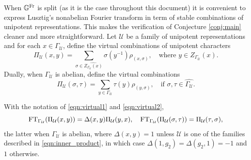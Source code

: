 \newpage

When $\mathbb{G}^{\mathrm{Fr}}$ is split (as it is the case throughout this document) it is convenient to express Lusztig's nonabelian Fourier transform in term of stable combinations of unipotent representations. This makes the verification of Conjecture \ref{conj:main} cleaner and more straightforward. Let $\mathcal{U}$ be a family of unipotent representations and for each $x\in\Gamma_\mathcal{U}$, define the virtual combinations of unipotent characters
\begin{equation}\label{eqn:virtual1}
    \Pi_\mathcal{U}(x,y)=\sum_{\sigma\in\widehat{Z_{\Gamma_\mathcal{U}}(x)}}\sigma(y^{-1})\rho_{(x,\sigma)},\quad\text{where } y\in Z_{\Gamma_\mathcal{U}}(x).
\end{equation}
Dually, when $\Gamma_\mathcal{U}$ is abelian, define the virtual combinations
\begin{equation}\label{eqn:virtual2}
    \Pi_\mathcal{U}(\sigma,\tau)=\sum_{y\in\Gamma_\mathcal{U}}\tau(y)\rho_{(y,\sigma)},\quad\text{if } \sigma,\tau\in \widehat{\Gamma_\mathcal{U}}.
\end{equation}


\begin{lemma}
    With the notation of \eqref{eqn:virtual1} and \eqref{eqn:virtual2}, 
    \begin{equation*}
        \mathrm{FT}_{\Gamma_\mathcal{U}}(\Pi_\mathcal{U}(x,y))=\Delta(x,y)\Pi_{\mathcal{U}}(y,x),\quad \mathrm{FT}_{\Gamma_\mathcal{U}}(\Pi_\mathcal{U}(\sigma,\tau))=\Pi_{\mathcal{U}}(\tau,\sigma),
    \end{equation*}
    the latter when $\Gamma_\mathcal{U}$ is abelian, where $\Delta(x,y)=1$ unless $\mathcal{U}$ is one of the families described in \eqref{eqn:inner_product}, in which case $\Delta(1,g_2)=\Delta(g_2,1)=-1$ and $1$ otherwise.
\end{lemma}


